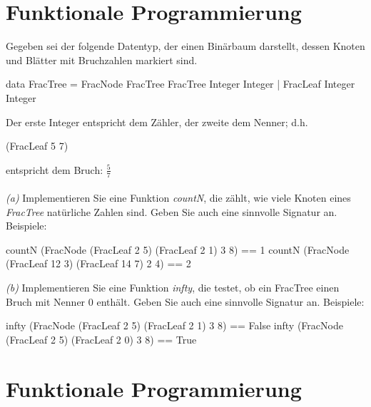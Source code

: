 \documentclass[11pt,a4paper,oneside,ngerman]{scrbook}
\begin{document}
\newpage



\section{Funktionale Programmierung}
Gegeben sei der folgende Datentyp, der einen Binärbaum darstellt, dessen Knoten und Blätter mit Bruchzahlen markiert sind.

\begin{code}
data FracTree = FracNode FracTree FracTree Integer Integer 
              | FracLeaf Integer Integer
\end{code}

Der erste Integer entspricht dem Zähler, der zweite dem Nenner; d.h.
\begin{code} 
(FracLeaf 5 7)
\end{code}
entspricht dem Bruch: $\frac57$
\\
\\
\emph{(a)} Implementieren Sie eine Funktion \emph{countN}, die zählt, wie viele Knoten eines \emph{FracTree} natürliche Zahlen sind. Geben Sie auch eine sinnvolle Signatur an.
Beispiele:
\begin{code}
  countN (FracNode (FracLeaf 2 5) (FracLeaf 2 1) 3 8) == 1
  countN (FracNode (FracLeaf 12 3) (FracLeaf 14 7) 2 4) == 2







\end{code}

\emph{(b)} Implementieren Sie eine Funktion \emph{infty}, die testet, ob ein FracTree einen Bruch mit Nenner 0 enthält. Geben Sie auch eine sinnvolle Signatur an.
Beispiele:
\begin{code}
  infty (FracNode (FracLeaf 2 5) (FracLeaf 2 1) 3 8) == False
  infty (FracNode (FracLeaf 2 5) (FracLeaf 2 0) 3 8) == True









\end{code}

\newpage


\section{Funktionale Programmierung}
\end{document}
